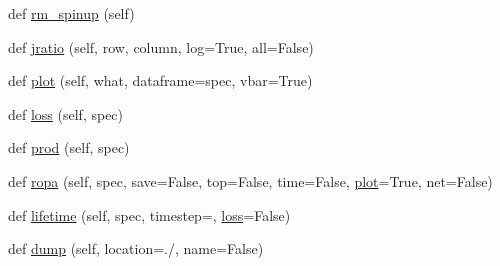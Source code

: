 \begin{DoxyCompactItemize}
def \mbox{\hyperlink{classzhdf_1_1new_aae8beafb28be4540cbe8b7b90b9915fb}{rm\+\_\+spinup}} (self)
\item 
def \mbox{\hyperlink{classzhdf_1_1new_a47eb4a577472f59215c79d2785c2588e}{jratio}} (self, row, column, log=True, all=False)
\item 
def \mbox{\hyperlink{classzhdf_1_1new_a9745f192f8c6f7e375a6fada1f44525a}{plot}} (self, what, dataframe=\textquotesingle{}spec\textquotesingle{}, vbar=True)
\item 
def \mbox{\hyperlink{classzhdf_1_1new_af05896dbaac383f107e46d76287d0ea0}{loss}} (self, spec)
\item 
def \mbox{\hyperlink{classzhdf_1_1new_a7e698f744d38ec1a6a308a21fafa63e5}{prod}} (self, spec)
\item 
def \mbox{\hyperlink{classzhdf_1_1new_aad68ddbb6791ca56a8495047091ccd72}{ropa}} (self, spec, save=False, top=False, time=False, \mbox{\hyperlink{classzhdf_1_1new_a9745f192f8c6f7e375a6fada1f44525a}{plot}}=True, net=False)
\item 
def \mbox{\hyperlink{classzhdf_1_1new_aa7d832d1f91a699ea51a319ac87e2a84}{lifetime}} (self, spec, timestep=\textquotesingle{}\textquotesingle{}, \mbox{\hyperlink{classzhdf_1_1new_af05896dbaac383f107e46d76287d0ea0}{loss}}=False)
\item 
def \mbox{\hyperlink{classzhdf_1_1new_a87ee987ac4b5f4fea8cc03cd78744f81}{dump}} (self, location=\textquotesingle{}./\textquotesingle{}, name=False)
\end{DoxyCompactItemize}
